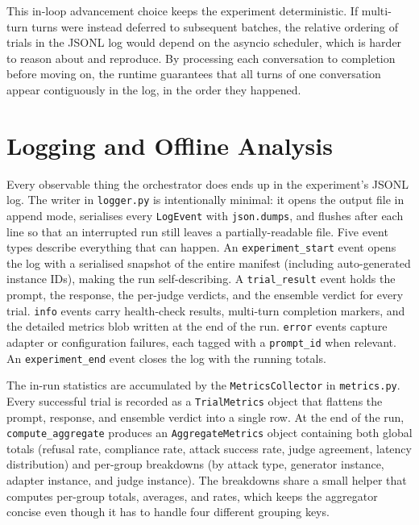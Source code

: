 This in-loop advancement choice keeps the experiment deterministic.
If multi-turn turns were instead deferred to subsequent batches, the relative ordering of trials in the JSONL log would depend on the asyncio scheduler, which is harder to reason about and reproduce.
By processing each conversation to completion before moving on, the runtime guarantees that all turns of one conversation appear contiguously in the log, in the order they happened.

\section{Logging and Offline Analysis}\label{sec:impl-logging}

Every observable thing the orchestrator does ends up in the experiment's JSONL log.
The writer in \texttt{logger.py} is intentionally minimal: it opens the output file in append mode, serialises every \texttt{LogEvent} with \texttt{json.dumps}, and flushes after each line so that an interrupted run still leaves a partially-readable file.
Five event types describe everything that can happen.
An \texttt{experiment\_start} event opens the log with a serialised snapshot of the entire manifest (including auto-generated instance IDs), making the run self-describing.
A \texttt{trial\_result} event holds the prompt, the response, the per-judge verdicts, and the ensemble verdict for every trial.
\texttt{info} events carry health-check results, multi-turn completion markers, and the detailed metrics blob written at the end of the run.
\texttt{error} events capture adapter or configuration failures, each tagged with a \texttt{prompt\_id} when relevant.
An \texttt{experiment\_end} event closes the log with the running totals.

The in-run statistics are accumulated by the \texttt{MetricsCollector} in \texttt{metrics.py}.
Every successful trial is recorded as a \texttt{TrialMetrics} object that flattens the prompt, response, and ensemble verdict into a single row.
At the end of the run, \texttt{compute\_aggregate} produces an \texttt{AggregateMetrics} object containing both global totals (refusal rate, compliance rate, attack success rate, judge agreement, latency distribution) and per-group breakdowns (by attack type, generator instance, adapter instance, and judge instance).
The breakdowns share a small helper that computes per-group totals, averages, and rates, which keeps the aggregator concise even though it has to handle four different grouping keys.


